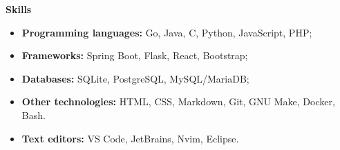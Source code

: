 {\vspace{0.5cm} \hspace{-0.5cm} \Large \textbf{Skills}}

\begin{itemize}
    \item \textbf{Programming languages:} Go, Java, C, Python, JavaScript, PHP;
    \item \textbf{Frameworks:} Spring Boot, Flask, React, Bootstrap;
    \item \textbf{Databases:} SQLite, PostgreSQL, MySQL/MariaDB;
    \item \textbf{Other technologies:} HTML, CSS, Markdown, Git, GNU Make, Docker, Bash.
    \item \textbf{Text editors:} VS Code, JetBrains, Nvim, Eclipse.
\end{itemize}
